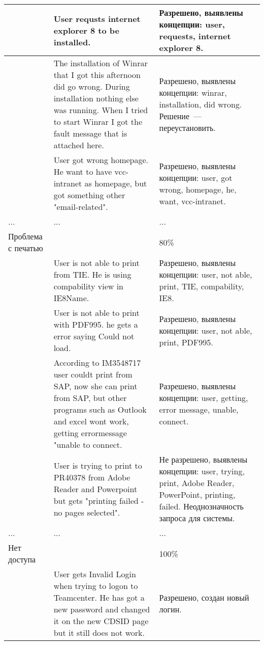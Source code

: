 \begin{longtable}{|p{5cm}|p{6cm}|p{5cm}|}
\hline         &    User requsts internet explorer 8 to be installed.   &  Разрешено, выявлены концепции: user, requests, internet explorer 8.  \\
\hline         &    The installation of Winrar that I got this afternoon did go wrong. During installation nothing else was running. When I tried to start Winrar I got the fault message that is attached here.   &  Разрешено, выявлены концепции: winrar, installation, did wrong. Решение~--- переустановить. \\

\hline         &    User got wrong homepage. He want to have vcc-intranet as homepage, but got something other "email-related".   &  Разрешено, выявлены концепции: user, got wrong, homepage, he, want, vcc-intranet.  \\
\hline     ...    &   ...   & ... \\



 \hline Проблема с печатью    &     & 80\% \\
 
 \hline         &    User is not able to print from TIE. He is using compability view in IE8Name.   &  Разрешено, выявлены концепции: user, not able, print, TIE, compability, IE8.  \\
 
  \hline         &    User is not able to print with PDF995. he gets a error saying Could not load.   &  Разрешено, выявлены концепции: user, not able, print, PDF995.  \\
 
 \hline         &    According to IM3548717 user couldt print from SAP, now she can print from SAP, but other programs such as Outlook and excel wont work, getting errormessage "unable to connect.   &  Разрешено, выявлены концепции: user, getting, error message, unable, connect.  \\
 
 \hline         &    User is trying to print to PR40378 from Adobe Reader and Powerpoint but gets "printing failed - no pages selected".   &  Не разрешено, выявлены концепции: user, trying, print, Adobe Reader, PowerPoint, printing, failed. Неоднозначность запроса для системы.  \\

 
\hline     ...    &   ...   & ... \\
  \hline Нет доступа         &       & 100\% \\
  
   \hline         &    User gets Invalid Login when trying to logon to Teamcenter. He has got a new password and changed it on the new CDSID page but it still does not work.    &  Разрешено, создан новый логин. \\


\end{longtable}
